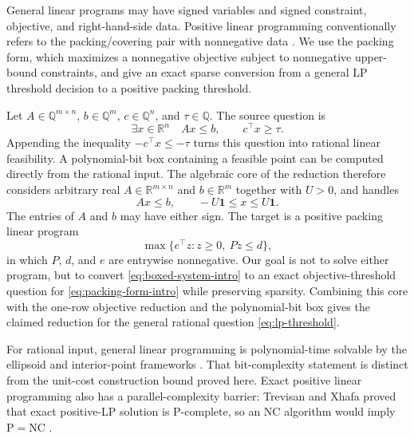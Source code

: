 \documentclass[11pt]{article}
\theoremstyle{remark}
\newcommand{\R}{\mathbb{R}}
\newcommand{\one}{\bm{1}}
\begin{document}
General linear programs may have signed variables and signed constraint,
objective, and right-hand-side data.  Positive linear programming
conventionally refers to the packing/covering pair with nonnegative data
\cite{LubyNisan1993PositiveLinearProgramming}.  We use the packing form,
which maximizes a nonnegative objective subject to nonnegative
upper-bound constraints, and give an exact sparse conversion from a
general LP threshold decision to a positive packing threshold.

Let $A\in\mathbb{Q}^{m\times n}$, $b\in\mathbb{Q}^m$,
$c\in\mathbb{Q}^n$, and $\tau\in\mathbb{Q}$.  The source question is
\begin{equation}
  \label{eq:lp-threshold}
  \exists x\in\R^n
  \quad
  Ax\leq b,
  \qquad
  c^\top x\geq\tau.
\end{equation}
Appending the inequality $-c^\top x\leq-\tau$ turns this question into
rational linear feasibility.  A polynomial-bit box containing a
feasible point can be computed directly from the rational input.  The
algebraic core of the reduction therefore considers arbitrary real
$A\in\R^{m\times n}$ and $b\in\R^m$ together with $U>0$, and handles
\begin{equation}
  \label{eq:boxed-system-intro}
  Ax\leq b,\qquad -U\one\leq x\leq U\one.
\end{equation}
The entries of $A$ and $b$ may have either sign.  The target is a
positive packing linear program
\begin{equation}
  \label{eq:packing-form-intro}
  \max\{e^\top z:z\geq0,\ Pz\leq d\},
\end{equation}
in which $P$, $d$, and $e$ are entrywise nonnegative.  Our goal is not
to solve either program, but to convert
\eqref{eq:boxed-system-intro} to an exact objective-threshold question
for \eqref{eq:packing-form-intro} while preserving sparsity.  Combining
this core with the one-row objective reduction and the polynomial-bit
box gives the claimed reduction for the general rational question
\eqref{eq:lp-threshold}.

For rational input, general linear programming is polynomial-time
solvable by the ellipsoid and interior-point frameworks
\cite{Khachiyan1979PolynomialLP,Karmarkar1984NewPolynomialTimeLP}.
That bit-complexity statement is distinct from the unit-cost
construction bound proved here.  Exact positive linear programming
also has a parallel-complexity barrier: Trevisan and Xhafa proved that
exact positive-LP solution is P-complete, so an NC algorithm would
imply $\mathrm{P}=\mathrm{NC}$
\cite{TrevisanXhafa1998ParallelComplexity}.
\end{document}
